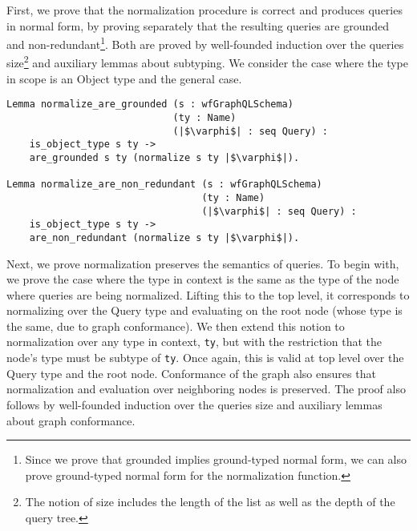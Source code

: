 First, we prove that the normalization procedure is correct  and produces queries in normal form, by proving separately that the resulting queries are grounded and non-redundant\footnote{Since we prove that grounded implies ground-typed normal form, we can also prove ground-typed normal form for the normalization function.}. Both are proved by well-founded induction over the queries size\footnote{The notion of size includes the length of the list as well as the depth of the query tree.} and auxiliary lemmas about subtyping.  We consider the case where the type in scope is an Object type  and the general case. 

\begin{verbatim}
Lemma normalize_are_grounded (s : wfGraphQLSchema)
                             (ty : Name)
                             (|$\varphi$| : seq Query) :
    is_object_type s ty ->
    are_grounded s ty (normalize s ty |$\varphi$|).

Lemma normalize_are_non_redundant (s : wfGraphQLSchema)
                                  (ty : Name)
                                  (|$\varphi$| : seq Query) :
    is_object_type s ty ->
    are_non_redundant (normalize s ty |$\varphi$|).

\end{verbatim}

Next, we prove normalization preserves the semantics of queries. To begin with, we prove the case where the type in context is the same as the type of the node where queries are being normalized. Lifting this to the top level, it corresponds to normalizing over the Query type and evaluating on the root node (whose type is the same, due to graph conformance). We then extend this notion to normalization over any type in context, \texttt{ty}, but with the restriction that the node's type must be subtype of \texttt{ty}. Once again, this is valid at top level over the Query type and the root node. Conformance of the graph also ensures that normalization and evaluation over neighboring nodes is preserved. The proof also follows by well-founded induction over the queries size and auxiliary lemmas about graph conformance.

